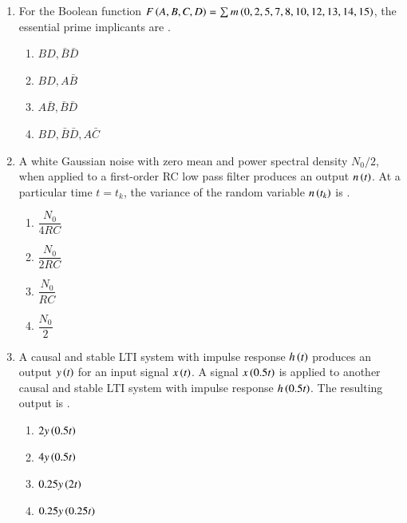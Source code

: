 \documentclass[journal,12pt,onecolumn]{IEEEtran}
\theoremstyle{remark}
\begin{document}
\begin{enumerate}
\item For the Boolean function $F\left(A, B, C,D\right) = \sum m\left(0,2,5,7,8,10,12,13,14,15\right)$, the essential prime implicants are \underline{\hspace{2cm}}.
\hfill{}
\begin{multicols}{4}
\begin{enumerate}
    \item $BD, \bar{B}\bar{D}$
    \item $BD, A\bar{B}$
    \item $A\bar{B}, \bar{B}\bar{D}$
    \item $BD, \bar{B}\bar{D}, A\bar{C}$
\end{enumerate}
\end{multicols}

\item A white Gaussian noise with zero mean and power spectral density $N_0/2$, when applied to a first-order RC low pass filter produces an output $n\left(t\right)$. At a particular time $t = t_k$, the variance of the random variable $n\left(t_k\right)$ is \underline{\hspace{2cm}}.
\hfill{}
\begin{multicols}{4}
    \begin{enumerate}
    \item $\dfrac{N_0}{4RC}$
    \item $\dfrac{N_0}{2RC}$
    \item $\dfrac{N_0}{RC}$
    \item $\dfrac{N_0}{2}$
\end{enumerate}
\end{multicols}


\item A causal and stable LTI system with impulse response $h\left(t\right)$ produces an output $y\left(t\right)$ for an input signal $x\left(t\right)$. A signal $x\left(0.5t\right)$ is applied to another causal and stable LTI system with impulse response $h\left(0.5t\right)$. The resulting output is \underline{\hspace{2cm}}.

\hfill{}
\begin{multicols}{4}
\begin{enumerate}
    \item $2y\left(0.5t\right)$
    \item $4y\left(0.5t\right)$
    \item $0.25y\left(2t\right)$
    \item $0.25y\left(0.25t\right)$
\end{enumerate}
\end{multicols}


\end{enumerate}
\end{document}
